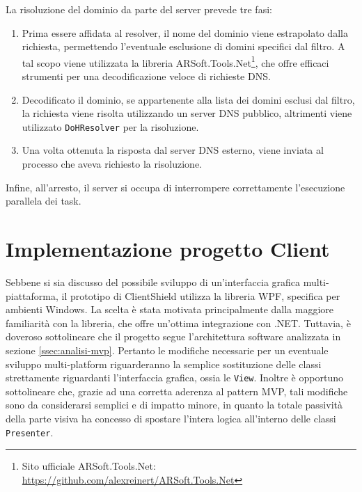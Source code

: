\documentclass[12pt,a4paper,openright,twoside]{book}
\newcommand{\class}[1]{\texttt{#1}}
\begin{document}
La risoluzione del dominio da parte del server prevede tre fasi:
\begin{enumerate}
	\item Prima essere affidata al resolver, il nome del dominio viene estrapolato dalla richiesta, permettendo l'eventuale esclusione di domini specifici dal filtro.
	A tal scopo viene utilizzata la libreria ARSoft.Tools.Net\footnote{Sito ufficiale ARSoft.Tools.Net: \url{https://github.com/alexreinert/ARSoft.Tools.Net}}, che offre efficaci strumenti per una decodificazione veloce di richieste \gls{DNS}.
	
	\item Decodificato il dominio, se appartenente alla lista dei domini esclusi dal filtro, la richiesta viene risolta utilizzando un server \gls{DNS} pubblico, altrimenti viene utilizzato \class{DoHResolver} per la risoluzione.
	
	\item Una volta ottenuta la risposta dal server \gls{DNS} esterno, viene inviata al processo che aveva richiesto la risoluzione.
\end{enumerate}
Infine, all'arresto, il server si occupa di interrompere correttamente l'esecuzione parallela dei task.

\section{Implementazione progetto Client}

Sebbene si sia discusso del possibile sviluppo di un'interfaccia grafica multi-piattaforma, il prototipo di ClientShield utilizza la libreria \gls{WPF}, specifica per ambienti Windows.
La scelta è stata motivata principalmente dalla maggiore familiarità con la libreria, che offre un'ottima integrazione con .NET.
Tuttavia, è doveroso sottolineare che il progetto segue l'architettura software analizzata in sezione \ref{ssec:analisi-mvp}.
Pertanto le modifiche necessarie per un eventuale sviluppo multi-platform riguarderanno la semplice sostituzione delle classi strettamente riguardanti l'interfaccia grafica, ossia le \class{View}.
Inoltre è opportuno sottolineare che, grazie ad una corretta aderenza al pattern \gls{MVP}, tali modifiche sono da considerarsi semplici e di impatto minore, in quanto la totale passività della parte visiva ha concesso di spostare l'intera logica all'interno delle classi \class{Presenter}.
\end{document}
